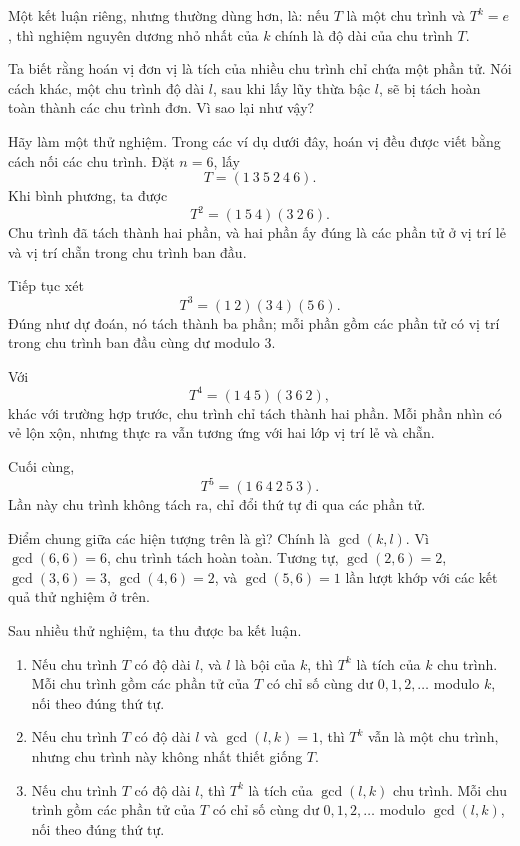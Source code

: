 \documentclass[11pt]{article}
\begin{document}
Một kết luận riêng, nhưng thường dùng hơn, là: nếu \(T\) là một chu trình và
\(T^k=e\), thì nghiệm nguyên dương nhỏ nhất của \(k\) chính là độ dài của
chu trình \(T\).

Ta biết rằng hoán vị đơn vị là tích của nhiều chu trình chỉ chứa một phần tử.
Nói cách khác, một chu trình độ dài \(l\), sau khi lấy lũy thừa bậc \(l\), sẽ
bị tách hoàn toàn thành các chu trình đơn. Vì sao lại như vậy?

Hãy làm một thử nghiệm. Trong các ví dụ dưới đây, hoán vị đều được viết bằng
cách nối các chu trình. Đặt \(n=6\), lấy
\[
  T=(1\ 3\ 5\ 2\ 4\ 6).
\]
Khi bình phương, ta được
\[
  T^2=(1\ 5\ 4)(3\ 2\ 6).
\]
Chu trình đã tách thành hai phần, và hai phần ấy đúng là các phần tử ở vị trí
lẻ và vị trí chẵn trong chu trình ban đầu.

Tiếp tục xét
\[
  T^3=(1\ 2)(3\ 4)(5\ 6).
\]
Đúng như dự đoán, nó tách thành ba phần; mỗi phần gồm các phần tử có vị trí
trong chu trình ban đầu cùng dư modulo \(3\).

Với
\[
  T^4=(1\ 4\ 5)(3\ 6\ 2),
\]
khác với trường hợp trước, chu trình chỉ tách thành hai phần. Mỗi phần nhìn có
vẻ lộn xộn, nhưng thực ra vẫn tương ứng với hai lớp vị trí lẻ và chẵn.

Cuối cùng,
\[
  T^5=(1\ 6\ 4\ 2\ 5\ 3).
\]
Lần này chu trình không tách ra, chỉ đổi thứ tự đi qua các phần tử.

Điểm chung giữa các hiện tượng trên là gì? Chính là \(\gcd(k,l)\). Vì
\(\gcd(6,6)=6\), chu trình tách hoàn toàn. Tương tự,
\(\gcd(2,6)=2\), \(\gcd(3,6)=3\), \(\gcd(4,6)=2\), và
\(\gcd(5,6)=1\) lần lượt khớp với các kết quả thử nghiệm ở trên.

Sau nhiều thử nghiệm, ta thu được ba kết luận.

\begin{enumerate}
  \item Nếu chu trình \(T\) có độ dài \(l\), và \(l\) là bội của \(k\), thì
  \(T^k\) là tích của \(k\) chu trình. Mỗi chu trình gồm các phần tử của
  \(T\) có chỉ số cùng dư \(0,1,2,\ldots\) modulo \(k\), nối theo đúng thứ tự.
  \item Nếu chu trình \(T\) có độ dài \(l\) và \(\gcd(l,k)=1\), thì \(T^k\)
  vẫn là một chu trình, nhưng chu trình này không nhất thiết giống \(T\).
  \item Nếu chu trình \(T\) có độ dài \(l\), thì \(T^k\) là tích của
  \(\gcd(l,k)\) chu trình. Mỗi chu trình gồm các phần tử của \(T\) có chỉ số
  cùng dư \(0,1,2,\ldots\) modulo \(\gcd(l,k)\), nối theo đúng thứ tự.
\end{enumerate}
\end{document}
